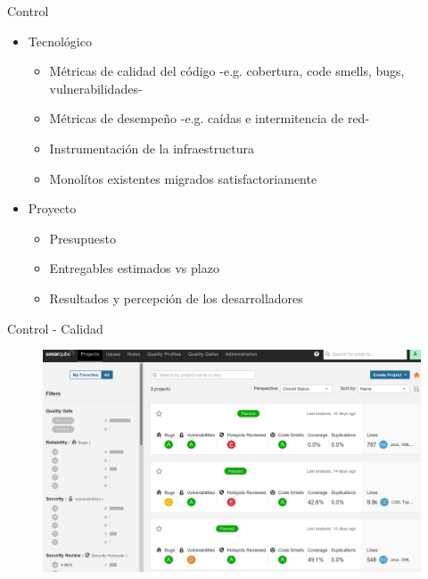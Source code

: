 \documentclass[aspectratio=169]{beamer}
\begin{document}
\begin{frame}{Control}

\begin{itemize}
\item Tecnológico
    \begin{itemize}
    \item Métricas de calidad del código -e.g. cobertura, code smells, bugs, vulnerabilidades-
    \item Métricas de desempeño -e.g. caídas e intermitencia de red-
    \item Instrumentación de la infraestructura
    \item Monolítos existentes migrados satisfactoriamente
    \end{itemize}
\item  Proyecto
    \begin{itemize}
    \item Presupuesto
    \item Entregables estimados vs plazo
    \item Resultados y percepción de los desarrolladores
    \end{itemize}
\end{itemize}
\end{frame}

\begin{frame}{Control - Calidad}
\begin{figure}
	\centering
	\includegraphics[width=\linewidth]{Images/sonar}
\end{figure}
\end{frame}
\end{document}
